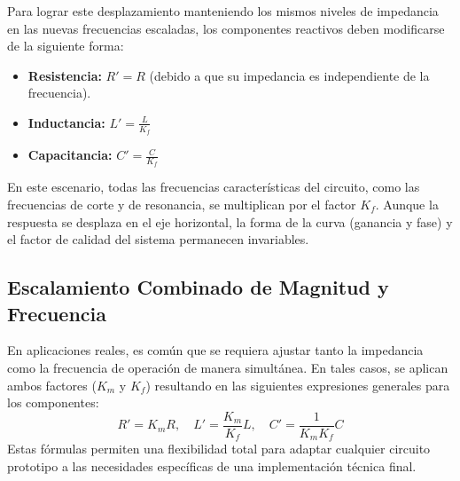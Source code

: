 Para lograr este desplazamiento manteniendo los mismos niveles de impedancia en las nuevas frecuencias escaladas, los componentes reactivos deben modificarse de la siguiente forma:
\begin{itemize}
	\item \textbf{Resistencia:} $R' = R$ (debido a que su impedancia es independiente de la frecuencia).
	\item \textbf{Inductancia:} $L' = \frac{L}{K_f}$
	\item \textbf{Capacitancia:} $C' = \frac{C}{K_f}$
\end{itemize}

En este escenario, todas las frecuencias características del circuito, como las frecuencias de corte y de resonancia, se multiplican por el factor $K_f$. Aunque la respuesta se desplaza en el eje horizontal, la forma de la curva (ganancia y fase) y el factor de calidad del sistema permanecen invariables.

\subsection{Escalamiento Combinado de Magnitud y Frecuencia}
En aplicaciones reales, es común que se requiera ajustar tanto la impedancia como la frecuencia de operación de manera simultánea. En tales casos, se aplican ambos factores ($K_m$ y $K_f$) resultando en las siguientes expresiones generales para los componentes:
\begin{equation}
	R' = K_m R, \quad L' = \frac{K_m}{K_f} L, \quad C' = \frac{1}{K_m K_f} C
\end{equation}
Estas fórmulas permiten una flexibilidad total para adaptar cualquier circuito prototipo a las necesidades específicas de una implementación técnica final.